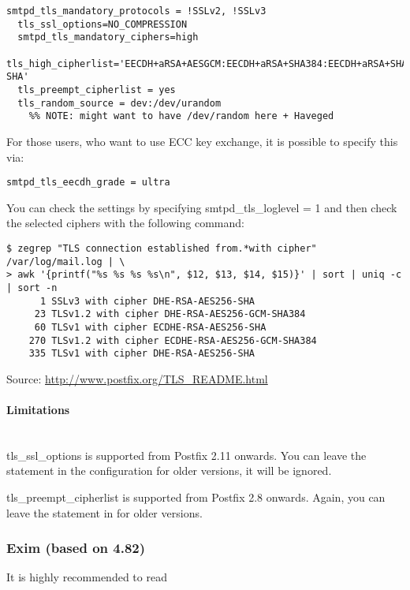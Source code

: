 \begin{lstlisting}[breaklines]
  smtpd_tls_mandatory_protocols = !SSLv2, !SSLv3
  tls_ssl_options=NO_COMPRESSION
  smtpd_tls_mandatory_ciphers=high
  tls_high_cipherlist='EECDH+aRSA+AESGCM:EECDH+aRSA+SHA384:EECDH+aRSA+SHA256:EDH+CAMELLIA256:EECDH:EDH+aRSA:+SSLv3:!aNULL:!eNULL:!LOW:!3DES:!MD5:!EXP:!PSK:!SRP:!DSS:!RC4:!SEED:!AES128:!CAMELLIA128:!ECDSA:AES256-SHA'
  tls_preempt_cipherlist = yes
  tls_random_source = dev:/dev/urandom		
    %% NOTE: might want to have /dev/random here + Haveged
\end{lstlisting}
  
For those users, who want to use ECC key exchange, it is possible to specify this via:
\begin{lstlisting}[breaklines]
  smtpd_tls_eecdh_grade = ultra
\end{lstlisting}

You can check the settings by specifying  smtpd\_tls\_loglevel = 1 and then check the selected ciphers with the following command:
\begin{lstlisting}[breaklines]
$ zegrep "TLS connection established from.*with cipher" /var/log/mail.log | \
> awk '{printf("%s %s %s %s\n", $12, $13, $14, $15)}' | sort | uniq -c | sort -n
      1 SSLv3 with cipher DHE-RSA-AES256-SHA
     23 TLSv1.2 with cipher DHE-RSA-AES256-GCM-SHA384
     60 TLSv1 with cipher ECDHE-RSA-AES256-SHA
    270 TLSv1.2 with cipher ECDHE-RSA-AES256-GCM-SHA384
    335 TLSv1 with cipher DHE-RSA-AES256-SHA
\end{lstlisting}

Source: \url{http://www.postfix.org/TLS_README.html}

\paragraph*{Limitations}\mbox{}\\

tls\_ssl\_options is supported from Postfix 2.11 onwards. You can
leave the statement in the configuration for older versions, it will
be ignored.

tls\_preempt\_cipherlist is supported from Postfix 2.8 onwards. Again,
you can leave the statement in for older versions.

\subsubsection{Exim (based on 4.82)}

It is highly recommended to read

